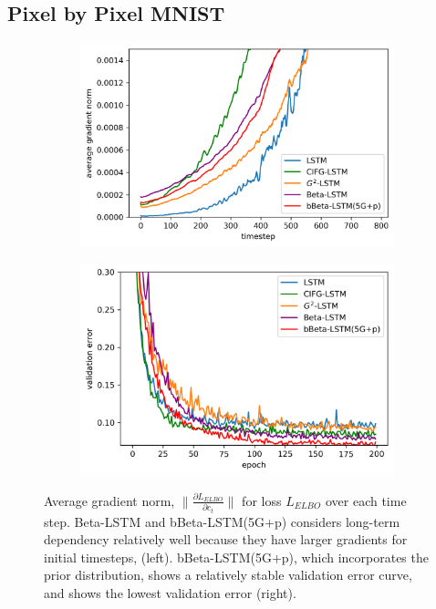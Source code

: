 \documentclass[letterpaper]{article} %
\begin{document}
\subsection{Pixel by Pixel MNIST}
%
\begin{figure}[t!]
	\centering
	\begin{subfigure}{.48\columnwidth}
		\centering
		\includegraphics[width=\linewidth]{average_gradient_norm.png}
	\end{subfigure}
	\begin{subfigure}{.48\columnwidth}
		\centering
		\includegraphics[width=\linewidth]{pMNIST_val_error.png}
	\end{subfigure}
	\caption{Average gradient norm, $\|{\frac{\partial L_{ELBO}}{\partial c_{t}}}\|$ for loss $L_{ELBO}$ over each time step. Beta-LSTM and bBeta-LSTM(5G+p) considers long-term dependency relatively well because they have larger gradients for initial timesteps, (left). bBeta-LSTM(5G+p), which incorporates the prior distribution, shows a relatively stable validation error curve, and shows the lowest validation error (right).}
	\label{fig:pMNIST_qualitative}
\end{figure}
\end{document}
